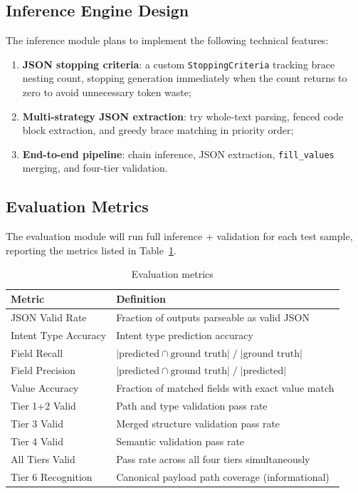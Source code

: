 \documentclass[12pt, a4paper]{article}
\newcommand{\fillvalues}{\texttt{fill\_values}}
\begin{document}
\subsection{Inference Engine Design}

The inference module plans to implement the following technical features:

\begin{enumerate}
  \item \textbf{JSON stopping criteria}: a custom \texttt{StoppingCriteria} tracking brace nesting count, stopping generation immediately when the count returns to zero to avoid unnecessary token waste;
  \item \textbf{Multi-strategy JSON extraction}: try whole-text parsing, fenced code block extraction, and greedy brace matching in priority order;
  \item \textbf{End-to-end pipeline}: chain inference, JSON extraction, \fillvalues{} merging, and four-tier validation.
\end{enumerate}

\subsection{Evaluation Metrics}

The evaluation module will run full inference + validation for each test sample, reporting the metrics listed in Table~\ref{tab:eval-metrics}.

\begin{table}[H]
\centering
\caption{Evaluation metrics}
\label{tab:eval-metrics}
\small
\begin{tabular}{lp{9.5cm}}
\toprule
\textbf{Metric} & \textbf{Definition} \\
\midrule
JSON Valid Rate       & Fraction of outputs parseable as valid JSON \\
Intent Type Accuracy  & Intent type prediction accuracy \\
Field Recall          & $|\text{predicted} \cap \text{ground truth}| \;/\; |\text{ground truth}|$ \\
Field Precision       & $|\text{predicted} \cap \text{ground truth}| \;/\; |\text{predicted}|$ \\
Value Accuracy        & Fraction of matched fields with exact value match \\
Tier 1+2 Valid        & Path and type validation pass rate \\
Tier 3 Valid          & Merged structure validation pass rate \\
Tier 4 Valid          & Semantic validation pass rate \\
All Tiers Valid       & Pass rate across all four tiers simultaneously \\
Tier 6 Recognition    & Canonical payload path coverage (informational) \\
\bottomrule
\end{tabular}
\end{table}
\end{document}
